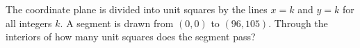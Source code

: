 The coordinate plane is divided into unit squares by the lines $x=k$ and $y=k$ for all integers $k$. A segment is drawn from $(0,0)$ to $(96,105)$. Through the interiors of how many unit squares does the segment pass?
